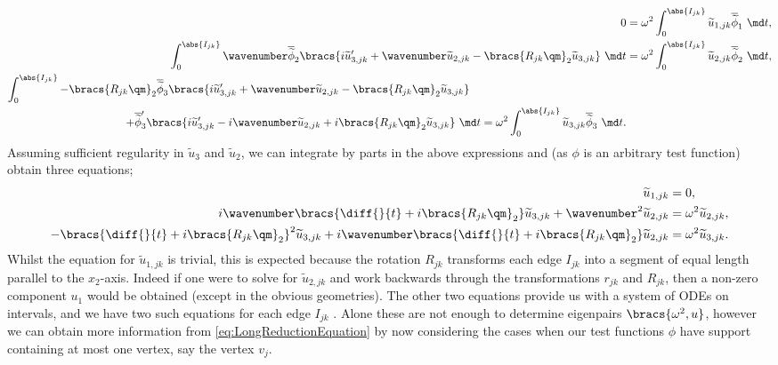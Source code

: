 \begin{subequations} \label{eq:SplitVariationalEdgeEqns}
	\begin{align}
		0 &= \omega^2 \int_0^{\abs{I_{jk}}} \widetilde{u}_{1,jk}\overline{\widetilde{\phi}}_1 \ \md t, \\
		\int_0^{\abs{I_{jk}}} \wavenumber\overline{\widetilde{\phi}}_2\bracs{i\widetilde{u}_{3,jk}' + \wavenumber\widetilde{u}_{2,jk} - \bracs{R_{jk}\qm}_2\widetilde{u}_{3,jk}} \ \md t
		&= \omega^2 \int_0^{\abs{I_{jk}}} \widetilde{u}_{2,jk}\overline{\widetilde{\phi}}_2 \ \md t, \\
		\begin{split}
			\int_0^{\abs{I_{jk}}} -\bracs{R_{jk}\qm}_2\overline{\widetilde{\phi}}_3\bracs{i\widetilde{u}_{3,jk}' + \wavenumber\widetilde{u}_{2,jk} - \bracs{R_{jk}\qm}_2\widetilde{u}_{3,jk}} \quad & \\
			+ \overline{\widetilde{\phi}}_3'\bracs{i\widetilde{u}_{3,jk}' - i\wavenumber\widetilde{u}_{2,jk} + i\bracs{R_{jk}\qm}_2\widetilde{u}_{3,jk}} \ \md t
			&= \omega^2 \int_0^{\abs{I_{jk}}} \widetilde{u}_{3,jk}\overline{\widetilde{\phi}}_3 \ \md t.
		\end{split}
	\end{align}
\end{subequations}
Assuming sufficient regularity in $\widetilde{u}_3$ and $\widetilde{u}_2$, we can integrate by parts in the above expressions and (as $\phi$ is an arbitrary test function) obtain three equations;
\begin{align*}
	\widetilde{u}_{1,jk} &= 0, \\
	i\wavenumber\bracs{\diff{}{t} + i\bracs{R_{jk}\qm}_2}\widetilde{u}_{3,jk} + \wavenumber^2\widetilde{u}_{2,jk} &= \omega^2 \widetilde{u}_{2,jk}, \\
	-\bracs{\diff{}{t} + i\bracs{R_{jk}\qm}_2}^2\widetilde{u}_{3,jk} + i\wavenumber\bracs{\diff{}{t} + i\bracs{R_{jk}\qm}_2}\widetilde{u}_{2,jk} &= \omega^2\widetilde{u}_{3,jk}.
\end{align*}
Whilst the equation for $\widetilde{u}_{1,jk}$ is trivial, this is expected because the rotation $R_{jk}$ transforms each edge $I_{jk}$ into a segment of equal length parallel to the $x_2$-axis.
Indeed if one were to solve for $\widetilde{u}_{2,jk}$ and work backwards through the transformations $r_{jk}$ and $R_{jk}$, then a non-zero component $u_1$ would be obtained (except in the obvious geometries).
The other two equations provide us with a system of ODEs on intervals, and we have two such equations for each edge $I_{jk}$ .
Alone these are not enough to determine eigenpairs $\bracs{\omega^2, u}$, however we can obtain more information from \eqref{eq:LongReductionEquation} by now considering the cases when our test functions $\phi$ have support containing at most one vertex, say the vertex $v_j$.
